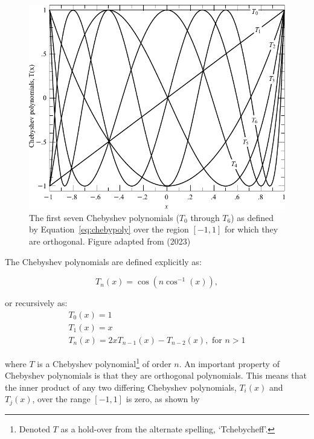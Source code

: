\begin{figure}[t]
    \centering
    \includegraphics[width = 12cm]{figures/2_chebyshev.pdf}
    \caption{The first seven Chebyshev polynomials ($T_0$ through $T_{6}$) as defined by Equation~\ref{eq:chebypoly} over the region $[-1, 1]$ for which they are orthogonal. Figure adapted from \citep{numerical_recipes} (2023)\protect\footnotemark}
    \label{fig:chebyshev}
\end{figure}

The Chebyshev polynomials are defined explicitly as:

\begin{equation}
    T_{n}(x) = \cos(n \cos^{-1}(x)),
    \label{eq:chebypolyexplicit}
\end{equation}

\noindent or recursively as:
\begin{equation}
    \begin{gathered}
        T_{0}(x) = 1 \\
        T_{1}(x) = x  \\
        T_{n}(x) = 2 x T_{n - 1}(x) - T_{n - 2}(x), \text{ for } n > 1
    \end{gathered}
    \label{eq:chebypoly}
\end{equation}

\noindent where $T$ is a Chebyshev polynomial\footnote{Denoted $T$ as a hold-over from the alternate spelling, `Tchebycheff'.} of order $n$. An important property of Chebyshev polynomials is that they are orthogonal polynomials. This means that the inner product of any two differing Chebyshev polynomials, $T_{i}(x)$ and $T_{j}(x)$, over the range $[-1, 1]$ is zero, as shown by

